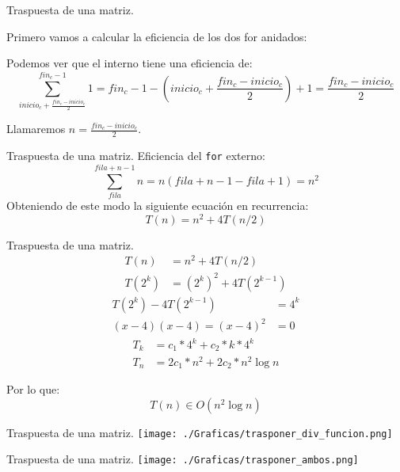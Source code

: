 \documentclass[10pt, xcolor=table]{beamer}
\begin{document}
\begin{frame}[fragile]{Traspuesta de una matriz. }

Primero vamos a calcular la eficiencia de los dos for anidados:

Podemos ver que el  interno tiene una eficiencia de:
$$ \sum^{fin_c-1}_{inicio_c+\frac{fin_c-inicio_c}{2}}1=fin_c-1-\left(inicio_c+\frac{fin_c-inicio_c}{2}\right)+1=\frac{fin_c-inicio_c}{2}$$

Llamaremos $n=\frac{fin_c-inicio_c}{2}$.
\end{frame}

\begin{frame}[fragile]{Traspuesta de una matriz. }
Eficiencia del \texttt{for} externo:
$$ \sum_{fila}^{fila+n-1} n = n(fila+n-1-fila+1) = n^2 $$
Obteniendo de este modo la siguiente ecuación en recurrencia:
$$ T(n) = n^2 + 4T(n/2) $$
\end{frame}

\begin{frame}[fragile]{Traspuesta de una matriz. }
\begin{align*}
T(n) &= n^2 + 4T(n/2)\\
T(2^k) &= (2^k)^2 + 4T(2^{k-1})
\end{align*}
\begin{align*}
T(2^k) - 4T(2^{k-1}) &= 4^k\\
(x-4)(x-4)=(x-4)^2 &= 0
\end{align*}
\begin{align*}
T_k &= c_1*4^k + c_2*k*4^k\\
T_n &= 2c_1*n^2+2c_2*n^2\log n
\end{align*}

Por lo que:
$$T(n)\in O(n^2\log n)$$
\end{frame}




\begin{frame}[fragile]{Traspuesta de una matriz. }
\texttt{[image: ./Graficas/trasponer\_div\_funcion.png]}
\end{frame}

\begin{frame}[fragile]{Traspuesta de una matriz. }
\texttt{[image: ./Graficas/trasponer\_ambos.png]}
\end{frame}
\end{document}
